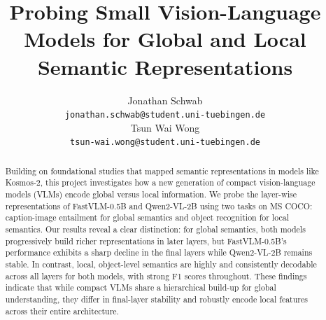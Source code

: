 \documentclass[11pt]{article}
\title{Probing Small Vision-Language
Models for Global and Local Semantic
Representations}
\author{Jonathan Schwab \\
  {\small\texttt{jonathan.schwab@student.uni-tuebingen.de}} \\\And
  Tsun Wai Wong \\
  {\small\texttt{tsun-wai.wong@student.uni-tuebingen.de}} \\}
\begin{document}
\maketitle
\begin{abstract}
Building on foundational studies that mapped semantic representations in models like Kosmos-2, this project investigates how a new generation of compact vision-language models (VLMs) encode global versus local information. We probe the layer-wise representations of FastVLM-0.5B and Qwen2-VL-2B using two tasks on MS COCO: caption-image entailment for global semantics and object recognition for local semantics. Our results reveal a clear distinction: for global semantics, both models progressively build richer representations in later layers, but FastVLM-0.5B's performance exhibits a sharp decline in the final layers while Qwen2-VL-2B remains stable. In contrast, local, object-level semantics are highly and consistently decodable across all layers for both models, with strong F1 scores throughout. These findings indicate that while compact VLMs share a hierarchical build-up for global understanding, they differ in final-layer stability and robustly encode local features across their entire architecture.
\end{abstract}
\end{document}
